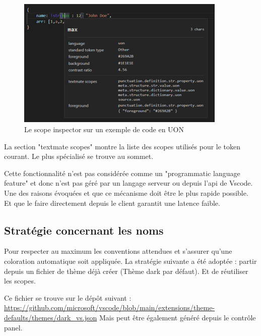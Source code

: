 \documentclass[
    iict, %
    il, %
]{heig-tb}
\begin{document}
\begin{figure}[!ht]
    \begin{center}
        \includegraphics[width=10cm]{assets/figures/scope-inspector.png}
    \end{center}
    \caption[Scope inspector]{\label{basic-uon} Le scope inspector sur un exemple de code en UON}
\end{figure}

La section "textmate scopes" montre la liste des scopes utilisés pour le token courant. Le plus spécialisé se trouve au sommet.

Cette fonctionnalité n’est pas considérée comme un "programmatic language feature" et donc n’est pas géré par un langage serveur ou depuis l’api de Vscode. Une des raisons évoquées et que ce mécanisme doit être le plus rapide possible. Et que le faire directement depuis le client garantit une latence faible.

\subsection{Stratégie concernant les noms}
Pour respecter au maximum les conventions attendues et s’assurer qu’une coloration automatique soit appliquée. La stratégie suivante a été adoptée : partir depuis un fichier de thème déjà créer (Thème dark par défaut). Et de réutiliser les scopes.

Ce fichier se trouve sur le dépôt suivant : \href{https://github.com/microsoft/vscode/blob/main/extensions/theme-defaults/themes/dark_vs.json}{https://github.com/microsoft/vscode/blob/main/extensions/theme-defaults/themes/dark_vs.json}
Mais peut être également généré depuis le contrôle panel.
\end{document}
